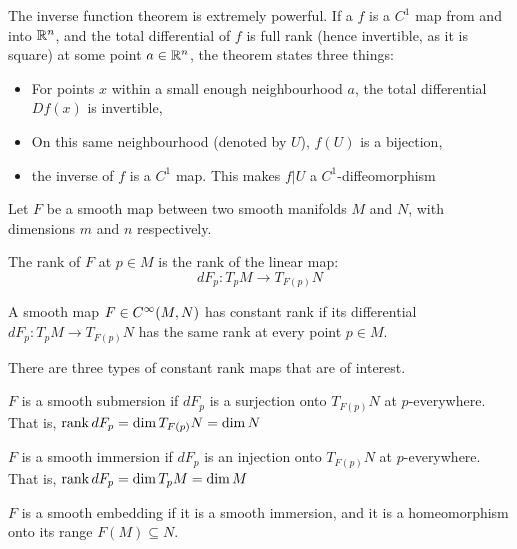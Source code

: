 \documentclass[../main-manifolds.tex]{subfiles}
\begin{document}
\begin{remark}
    The inverse function theorem is extremely powerful. If a $f$ is a $C^1$ map from and into ${\mathbb{R}^n}$, and the total differential of $f$ is full rank (hence invertible, as it is square) at some point $a\in{\mathbb{R}^n}$, the theorem states three things:
    \begin{itemize}
        \item For points $x$ within a small enough neighbourhood $a$, the total differential $Df(x)$ is invertible,
        \item On this same neighbourhood (denoted by $U$), $f(U)$ is a bijection,
        \item the inverse of $f$ is a $C^1$ map. This makes $f|U$ a $C^1$-diffeomorphism
    \end{itemize}
\end{remark}

Let $F$ be a smooth map between two smooth manifolds $M$ and $N$, with dimensions $m$ and $n$ respectively.


\begin{definition}
    The rank of $F$ at $p\in M$ is the rank of the linear map:
\[
    dF_p: T_pM\to T_{F(p)}N
\]\end{definition}

\begin{definition}
A smooth map $F\in \cinf[M,N]$ has constant rank if its differential $dF_p: T_pM\to T_{F(p)}N$ has the same rank at every point $p\in M$.\end{definition}

There are three types of constant rank maps that are of interest. 
\begin{definition}\label{lee-chp4:smooth-submersion-definition}
    $F$ is a smooth submersion if $dF_p$ is a surjection onto $T_{F(p)}N$ at $p$-everywhere. That is, $\operatorname{rank} dF_p = \operatorname{dim} T_{F(p)}N = \operatorname{dim} N$\end{definition}

\begin{definition}\label{lee-chp4:smooth-immersion-definition}
    $F$ is a smooth immersion if $dF_p$ is an injection onto $T_{F(p)}N$ at $p$-everywhere. That is, $\operatorname{rank} dF_p = \operatorname{dim} T_{p}M = \operatorname{dim} M$\end{definition}


\begin{definition}\label{lee-chp4:smooth-embedding-definition}
    $F$ is a smooth embedding if it is a smooth immersion, and it is a homeomorphism onto its range $F(M)\subseteq N$. 
\end{definition}
\end{document}
